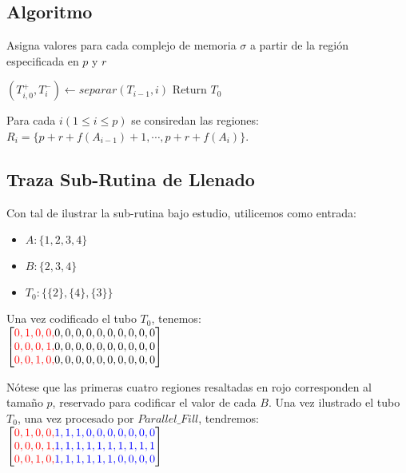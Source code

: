 \documentclass[12pt, letterpaper, twoside]{article}
\begin{document}
   \subsection{Algoritmo}
    \begin{algorithm}
        \caption{Asigna valores para cada complejo de memoria $\sigma$ a partir de la región especificada en $p$ y $r$}
        \label{ParallelFill}
        \begin{algorithmic}[1]
                \State $(T^+_{i,0}, T^-_i) \leftarrow separar(T_{i-1}, i)$
                \EndFor
            \EndFor
            \State Return $T_0$
            \EndProcedure
        \end{algorithmic}
    \end{algorithm}
    \par Para cada $i (1\leq i \leq p)$ se consiredan las regiones:\\ $R_i=\{p+r+f(A_{i-1})+1,\cdots,p+r+f(A_i)\}$.
   \subsection{Traza Sub-Rutina de Llenado}
   \par Con tal de ilustrar la sub-rutina bajo estudio, utilicemos como entrada:
   \begin{itemize}
       \item $A: \{1, 2, 3, 4\}$
       \item $B: \{2, 3, 4\}$
       \item $T_0: \{\{2\}, \{4\}, \{3\}\}$
    \end{itemize}
    \par Una vez codificado el tubo $T_0$, tenemos: \\
    $
       \begin{bmatrix}
        \textcolor{red}{0, 1, 0, 0,} 0, 0, 0, 0, 0, 0, 0, 0, 0, 0 \\
        \textcolor{red}{0, 0, 0, 1,} 0, 0, 0, 0, 0, 0, 0, 0, 0, 0 \\
        \textcolor{red}{0, 0, 1, 0,} 0, 0, 0, 0, 0, 0, 0, 0, 0, 0
        \end{bmatrix}
    $
    \par Nótese que las primeras cuatro regiones resaltadas en rojo corresponden al tamaño $p$, reservado para codificar el valor de cada $B$. Una vez ilustrado el tubo $T_0$, una vez procesado por $Parallel\_Fill$, tendremos: \\
    $
        \begin{bmatrix}
            \textcolor{red}{0, 1, 0, 0,} \textcolor{blue}{1, 1, 1, 0, 0, 0, 0, 0, 0, 0} \\
            \textcolor{red}{0, 0, 0, 1,} \textcolor{blue}{1, 1, 1, 1, 1, 1, 1, 1, 1, 1} \\
            \textcolor{red}{0, 0, 1, 0,} \textcolor{blue}{1, 1, 1, 1, 1, 1, 0, 0, 0, 0}
        \end{bmatrix}
    $
\end{document}
